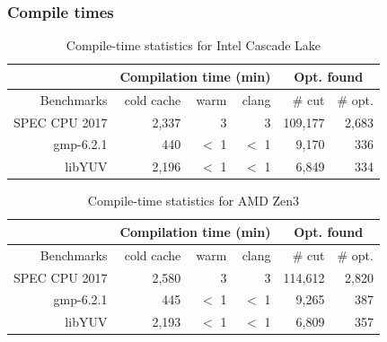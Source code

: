 \subsubsection{Compile times}
%
\begin{table}[t]
  \centering
  \begin{tabular}{| r | r r r | r r |}
    \hline
    & \multicolumn{3}{c|}{Compilation time (min)} & \multicolumn{2}{c|}{Opt. found}   \\
    \hline
    Benchmarks & cold cache & warm & clang & \# cut & \# opt. \\
    \hline\hline
    SPEC CPU 2017 & 2,337 & 3 & 3 & 109,177 & 2,683\\
    \hline
    gmp-6.2.1 & 440 & $<$ 1 & $<$ 1 & 9,170 & 336 \\
    \hline
    libYUV & 2,196 & $<$ 1 & $<$ 1 & 6,849 & 334  \\
    \hline
  \end{tabular}
  \caption{Compile-time statistics for Intel Cascade Lake}
  \label{tab:compiletime-intel}
\end{table}

\begin{table}[t]
  \centering
  \begin{tabular}{| r | r r r | r r |}
    \hline
    & \multicolumn{3}{c|}{Compilation time (min)} & \multicolumn{2}{c|}{Opt. found}  \\
    \hline
    Benchmarks & cold cache & warm & clang & \# cut & \# opt. \\
    \hline\hline
    SPEC CPU 2017 & 2,580 & 3 & 3 & 114,612 & 2,820 \\
    \hline
    gmp-6.2.1& 445 & $<$ 1 & $<$ 1 & 9,265 & 387\\
    \hline
    libYUV & 2,193 & $<$ 1 & $<$ 1 & 6,809 & 357 \\
    \hline
  \end{tabular}
  \caption{Compile-time statistics for AMD Zen3}
  \label{tab:compiletime-amd}
\end{table}


